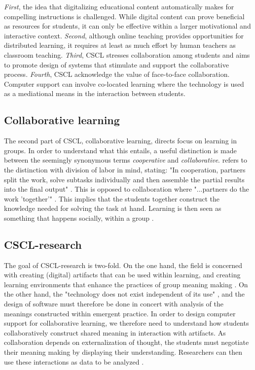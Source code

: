 \emph{First}, the idea that digitalizing educational content automatically makes for compelling instructions is challenged. While digital content can prove beneficial as resources for students, it can only be effective within a larger motivational and interactive context. \emph{Second}, although online teaching provides opportunities for distributed learning, it requires at least as much effort by human teachers as classroom teaching. \emph{Third}, CSCL stresses collaboration among students and aims to promote design of systems that stimulate and support the collaborative process. \emph{Fourth}, CSCL acknowledge the value of face-to-face collaboration. Computer support can involve co-located learning where the technology is used as a mediational means in the interaction between students.

\subsection{Collaborative learning}
The second part of CSCL, collaborative learning, directs focus on learning in groups. In order to understand what this entails, a useful distinction is made between the seemingly synonymous terms \emph{cooperative} and \emph{collaborative}. \citet*{dillenbourg1999you} refers to the distinction with division of labor in mind, stating: "In cooperation, partners split the work, solve subtasks individually and then assemble the partial results into the final output" \citep[p. 8]{dillenbourg1999you}. This is opposed to collaboration where "...partners do the work 'together'" \citep{dillenbourg1999you}. This implies that the students together construct the knowledge needed for solving the task at hand. Learning is then seen as something that happens socially, within a group \citep{stahl2006computer}. 

\subsection{CSCL-research}
The goal of CSCL-research is two-fold. On the one hand, the field is concerned with creating (digital) artifacts that can be used within learning, and creating learning environments that enhance the practices of group meaning making \citep{stahl2006computer}. On the other hand, the "technology does not exist independent of its use" \citep[\citealp{LeBaron2002} referenced in][]{stahl2006computer}, and the design of software must therefore be done in concert with analysis of the meanings constructed within emergent practice. In order to design computer support for collaborative learning, we therefore need to understand how students collaboratively construct shared meaning in interaction with artifacts. As collaboration depends on externalization of thought, the students must negotiate their meaning making by displaying their understanding. Researchers can then use these interactions as data to be analyzed \citep{stahl2006computer}.

